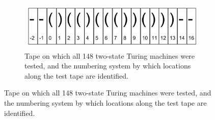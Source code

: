 \documentclass[12pt]{article}
\begin{document}
\begin{figure}[p]

\begin{subfigure}[b]{1.0\textwidth}
	\centering
	\includegraphics[width=140mm]{ICERtapeLocations.png}
	\caption{Tape on which all 148 two-state Turing machines were tested, and the numbering system by which locations along the test tape are identified.}
	\label{tapeLocations}
\end{subfigure}


\end{figure}
\end{document}
